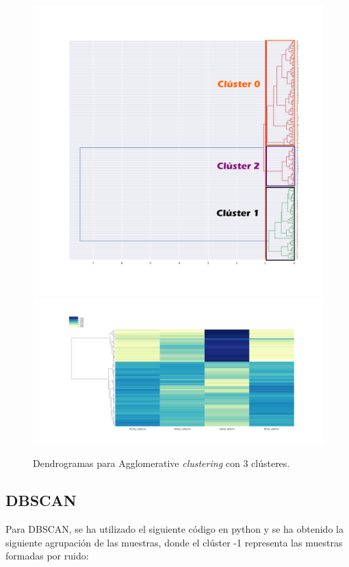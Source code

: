 \documentclass[a4paper, 20pt]{article}
\begin{document}
\clearpage

\begin{figure}[h]
\centering
\includegraphics[scale=0.35]{dani/dendrogramcolor.png}
\includegraphics[scale=0.35]{dani/dendscatAggClusterIRIS.png}
\caption{Dendrogramas para Agglomerative \textit{clustering} con 3 clústeres.}
\label{dac}
\end{figure}

\clearpage

\subsection{DBSCAN}

Para DBSCAN, se ha utilizado el siguiente código en python y se ha obtenido la siguiente agrupación de las muestras, donde el clúster -1 representa las muestras formadas por ruido:\\
\end{document}
